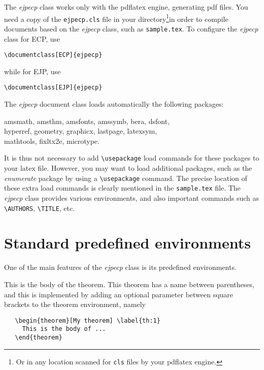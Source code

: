 \documentclass[ECP]{ejpecp} %
\begin{document}
The \emph{ejpecp} class works only with the pdflatex engine, generating pdf
files. You need a copy of the \texttt{ejpecp.cls} file in your
directory\footnote{Or in any location scanned for \texttt{cls} files by your
  pdflatex engine.}in order to compile documents based on the \emph{ejpecp}
class, such as \texttt{sample.tex}. To configure the \emph{ejpecp} class for
ECP, use
\begin{verbatim}
\documentclass[ECP]{ejpecp}
\end{verbatim}
while for EJP, use
\begin{verbatim}
\documentclass[EJP]{ejpecp}
\end{verbatim}
The \emph{ejpecp} document class loads automatically the following packages:
\begin{center}
  \ttfamily
  amsmath, amsthm, amsfonts, amssymb, bera, dsfont, \\
  hyperref, geometry, graphicx, lastpage, latexsym, \\
  mathtools, fixltx2e, microtype.
\end{center}
It is thus not necessary to add \verb+\usepackage+ load commands for
these packages to your latex file. However, you may want to load additional
packages, such as the \emph{enumerate} package by using a \verb+\usepackage+
command. The precise location of these extra load commands is clearly
mentioned in the \texttt{sample.tex} file. The \emph{ejpecp} class provides
various environments, and also important commands such as \verb+\AUTHORS+,
\verb+\TITLE+, etc.
 
\section{Standard predefined environments}

One of the main features of the \emph{ejpecp} class is its predefined
environments.

 \begin{theorem}[My theorem]\label{th:1}
   This is the body of the theorem. This theorem has a name between
   parentheses, and this is implemented by adding an optional parameter
   between square brackets to the theorem environment, namely
\begin{verbatim}
   \begin{theorem}[My theorem] \label{th:1}
     This is the body of ...
   \end{theorem}
\end{verbatim}
 \end{theorem}
\end{document}
